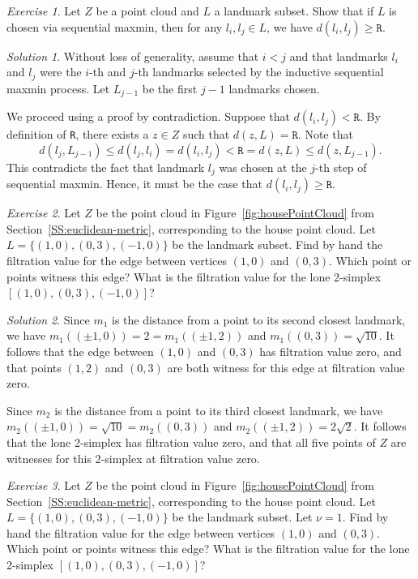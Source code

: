 \documentclass[amscd, amssymb, verbatim]{amsart}[12pt]
\theoremstyle{remark}
\theoremstyle{remark}
\newtheorem{exerciseSol}{Exercise}
\theoremstyle{remark}
\newtheorem*{solution}{Solution}
\begin{document}
\begin{exerciseSol}
Let $Z$ be a point cloud and $L$ a landmark subset. Show that if $L$ is chosen via sequential maxmin, then for any $l_i,l_j\in L$, we have $d(l_i,l_j)\geq\texttt{R}$.
\end{exerciseSol}

\begin{solution}
Without loss of generality, assume that $i < j$ and that landmarks $l_i$ and $l_j$ were the $i$-th and $j$-th landmarks selected by the inductive sequential maxmin process. Let $L_{j-1}$ be the first $j - 1$ landmarks chosen. 

We proceed using a proof by contradiction. Suppose that $d(l_i, l_j) < \texttt{R}$. By definition of \texttt{R}, there exists a $z \in Z$ such that $d(z,L) = \texttt{R}$. Note that
$$d(l_j, L_{j-1}) \leq d(l_j, l_i) = d(l_i, l_j) < \texttt{R} = d(z,L) \leq d(z, L_{j-1}).$$
This contradicts the fact that landmark $l_j$ was chosen at the $j$-th step of sequential maxmin. Hence, it must be the case that $d(l_i, l_j) \geq \texttt{R}$. 
\end{solution}

\begin{exerciseSol}
Let $Z$ be the point cloud in Figure~\ref{fig:housePointCloud} from Section~\ref{SS:euclidean-metric}, corresponding to the house point cloud. Let $L = \{(1,0),(0,3),(-1,0)\}$ be the landmark subset. Find by hand the filtration value for the edge between vertices $(1,0)$ and $(0,3)$. Which point or points witness this edge? What is the filtration value for the lone 2-simplex $[(1,0),(0,3),(-1,0)]$?
\end{exerciseSol}

\begin{solution}
Since $m_1$ is the distance from a point to its second closest landmark, we have $m_1((\pm1,0))=2=m_1((\pm1,2))$ and $m_1((0,3))=\sqrt{10}$. It follows that the edge between $(1,0)$ and $(0,3)$ has filtration value zero, and that points $(1,2)$ and $(0,3)$ are both witness for this edge at filtration value zero.

Since $m_2$ is the distance from a point to its third closest landmark, we have $m_2((\pm1,0))=\sqrt{10}=m_2((0,3))$ and $m_2((\pm1,2))=2\sqrt{2}$. It follows that the lone 2-simplex has filtration value zero, and that all five points of $Z$ are witnesses for this 2-simplex at filtration value zero.
\end{solution}

\begin{exerciseSol}
Let $Z$ be the point cloud in Figure~\ref{fig:housePointCloud} from Section~\ref{SS:euclidean-metric}, corresponding to the house point cloud. Let $L = \{(1,0),(0,3),(-1,0)\}$ be the landmark subset. Let $\nu = 1$. Find by hand the filtration value for the edge between vertices $(1,0)$ and $(0,3)$. Which point or points witness this edge? What is the filtration value for the lone 2-simplex $[(1,0),(0,3),(-1,0)]$?
\end{exerciseSol}
\end{document}
